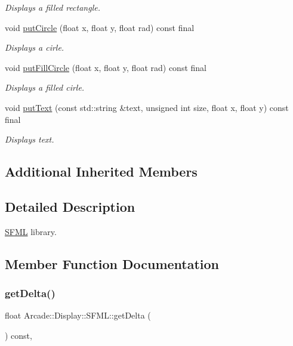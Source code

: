 \begin{DoxyCompactItemize}
\begin{DoxyCompactList}\small\item\em Displays a filled rectangle. \end{DoxyCompactList}\item 
void \mbox{\hyperlink{classArcade_1_1Display_1_1SFML_a46143388a143114f2513a408d2237d7c}{put\+Circle}} (float x, float y, float rad) const final
\begin{DoxyCompactList}\small\item\em Displays a cirle. \end{DoxyCompactList}\item 
void \mbox{\hyperlink{classArcade_1_1Display_1_1SFML_a6ca75268a9d059b40c64098841bd2475}{put\+Fill\+Circle}} (float x, float y, float rad) const final
\begin{DoxyCompactList}\small\item\em Displays a filled cirle. \end{DoxyCompactList}\item 
void \mbox{\hyperlink{classArcade_1_1Display_1_1SFML_a88bb03b669afd0df748fd66bf24d45f3}{put\+Text}} (const std\+::string \&text, unsigned int size, float x, float y) const final
\begin{DoxyCompactList}\small\item\em Displays text. \end{DoxyCompactList}\end{DoxyCompactItemize}
\subsection*{Additional Inherited Members}


\subsection{Detailed Description}
\mbox{\hyperlink{classArcade_1_1Display_1_1SFML}{S\+F\+ML}} library. 

\subsection{Member Function Documentation}
\mbox{\label{classArcade_1_1Display_1_1SFML_ae1466db8c13b08e99ebe5ffab68884c7}} 
\subsubsection{\texorpdfstring{getDelta()}{getDelta()}}
{\footnotesize\ttfamily float Arcade\+::\+Display\+::\+S\+F\+M\+L\+::get\+Delta (\begin{DoxyParamCaption}{ }\end{DoxyParamCaption}) const\hspace{0.3cm}{\ttfamily [final]}, {\ttfamily [virtual]}}



